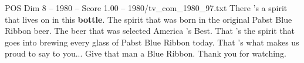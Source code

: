\begin{textsample}{POS Dim 8 – 1980 – Score 1.00 – 1980/tv\_com\_1980\_97.txt}  \label{ex:f8_pos_047}
There 's a spirit that lives on in this \textbf{bottle}.
The spirit that was born in the original Pabst Blue Ribbon beer.
The beer that was selected America 's Best.
That 's the spirit that goes into brewing every glass of Pabst Blue Ribbon today.
That 's what makes us proud to say to you...
Give that man a Blue Ribbon.
Thank you for watching.

\end{textsample}
